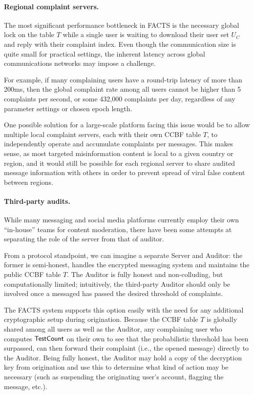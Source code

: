 \paragraph{Regional complaint servers.}
The most significant performance bottleneck in FACTS is the necessary global
lock on the table $T$ while a single user is waiting to download their
user set $U_C$ and reply with their complaint index. Even though the communication size
is quite small for practical settings, the inherent latency across global communications
networks may impose a challenge.

For example, if many complaining users have a round-trip latency of more than 200ms,
then the global complaint rate among all users cannot be higher than 5 complaints per
second, or some 432,000 complaints per day, regardless of any parameter settings or
chosen epoch length.

One possible solution for a large-scale platform facing this issue would be to
allow multiple local complaint servers, each with their
own CCBF table $T$, to independently operate and accumulate complaints per messages.
This makes sense, as most targeted misinformation content is local to a given country
or region, and it would still be possible for each regional server to share audited
message information with others in order to prevent spread of viral false content
between regions.

\paragraph{Third-party audits.}\label{sect:third-party-audits}
While many messaging and social media platforms currently employ their own
``in-house'' teams for content moderation, there have been some attempts at
separating the role of the server from that of auditor.

From a protocol standpoint, we can imagine a separate Server and Auditor: the former
is semi-honest, handles the encrypted messaging system and maintains the public
CCBF table $T$. The Auditor is fully honest and non-colluding,
but computationally limited; intuitively, the third-party Auditor should only
be involved once a messaged has passed the desired threshold of complaints.

The FACTS system supports this option easily with the need for any additional
cryptographic setup during origination. Because the CCBF table $T$ is globally shared
among all users as well as the Auditor, any complaining user who computes
$\mathsf{TestCount}{}$ on their own to see that the probabilistic threshold has been surpassed,
can then forward their complaint (i.e., the opened message) directly to the Auditor.
Being fully honest, the Auditor may hold a copy of the decryption key from origination
and use this to determine what kind of action may be necessary (such as suspending
the originating user's account, flagging the message, etc.).

